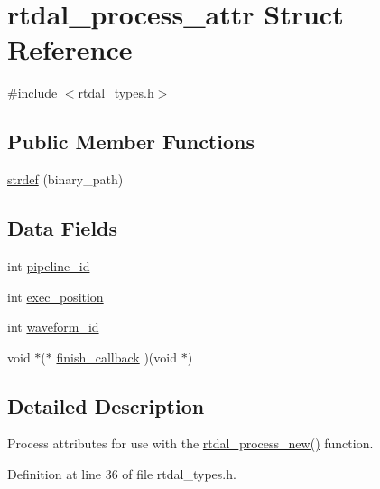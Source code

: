 \hypertarget{structrtdal__process__attr}{\section{rtdal\-\_\-process\-\_\-attr Struct Reference}
\label{structrtdal__process__attr}
}


{\ttfamily \#include $<$rtdal\-\_\-types.\-h$>$}

\subsection*{Public Member Functions}
\begin{DoxyCompactItemize}
\item 
\hyperlink{structrtdal__process__attr_af5db7229c0df55e9fe7e9a77dc2362af}{strdef} (binary\-\_\-path)
\end{DoxyCompactItemize}
\subsection*{Data Fields}
\begin{DoxyCompactItemize}
\item 
int \hyperlink{structrtdal__process__attr_acd4d32580ab29e3b881bebe616b5e833}{pipeline\-\_\-id}
\item 
int \hyperlink{structrtdal__process__attr_ad1462da5986c023d9865b556220bec0c}{exec\-\_\-position}
\item 
int \hyperlink{structrtdal__process__attr_a1c0bf46255fa36473470d432234e626f}{waveform\-\_\-id}
\item 
void $\ast$($\ast$ \hyperlink{structrtdal__process__attr_ae9b5f9e60d4117f1da3e8bcc09161a4b}{finish\-\_\-callback} )(void $\ast$)
\end{DoxyCompactItemize}


\subsection{Detailed Description}
Process attributes for use with the \hyperlink{group__process_gaac39f57d3d63eca01423a7ffd95026e1}{rtdal\-\_\-process\-\_\-new()} function. 

Definition at line 36 of file rtdal\-\_\-types.\-h.



